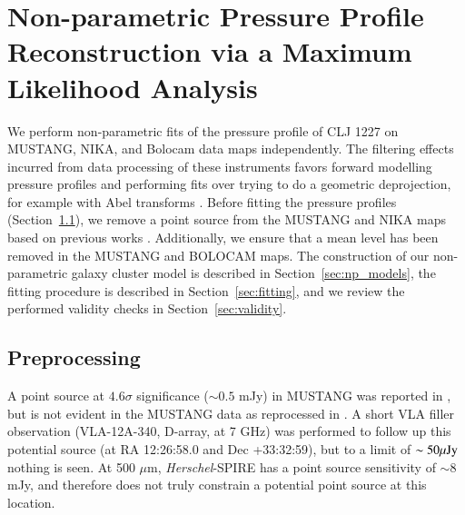 \documentclass[twocolumn,traditabstract]{aa}
\begin{document}

\section{Non-parametric Pressure Profile Reconstruction via a Maximum Likelihood Analysis}
\label{sec:ml_deproj}


We perform non-parametric fits of the pressure profile of CLJ 1227 on MUSTANG, NIKA, and Bolocam data maps independently.
The filtering effects incurred from data processing of these instruments favors forward modelling pressure profiles and
performing fits over trying to do a geometric deprojection, for example with Abel transforms \citep[e.g.][]{basu2010}.
Before fitting the pressure profiles (Section~\ref{sec:preprocessing}),
we remove a point source from the MUSTANG and NIKA maps based on previous works
\citep{adam2015,romero2017}. Additionally, we ensure that a mean level has been removed in the MUSTANG and BOLOCAM maps. 
The construction of our non-parametric galaxy cluster model is described in Section~\ref{sec:np_models}, the fitting
procedure is described in Section~\ref{sec:fitting}, and we review the performed validity checks in Section~\ref{sec:validity}.

\subsection{Preprocessing}
\label{sec:preprocessing}


A point source at $4.6\sigma$ significance ($\sim 0.5$ mJy) in MUSTANG was reported in \citet{korngut2011}, but is not
evident in the MUSTANG data as reprocessed in \citet{romero2017}. A short VLA filler observation (VLA-12A-340, D-array, at 7 GHz)
was performed to follow up this potential source (at RA 12:26:58.0 and Dec +33:32:59), but to a limit of $\sim 50 {\rm \mu Jy}$ nothing
is seen\citep{romero2017}. At 500 $\mu$m, \emph{Herschel}-SPIRE has a point source sensitivity of $\sim 8$ mJy,
and therefore does not truly constrain a potential point source at this location.
\end{document}
